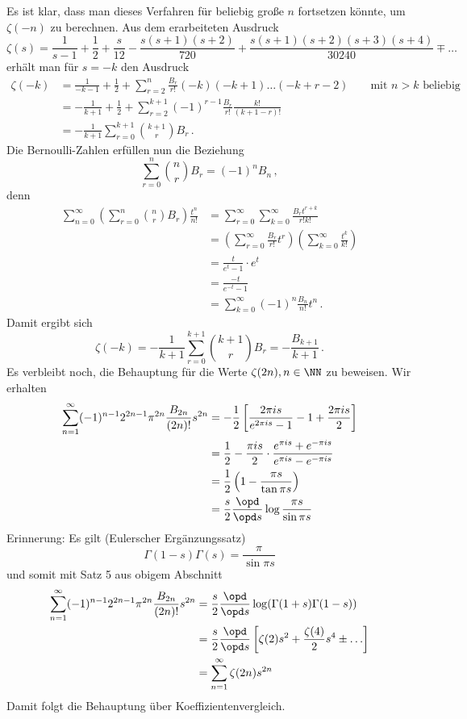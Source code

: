 Es ist klar, dass man dieses Verfahren für beliebig große $n$ fortsetzen könnte, um $\zeta(-n)$ zu berechnen. Aus dem erarbeiteten Ausdruck 
\[
	\zeta(s)
	= \frac 1{s-1} + \frac 12 + \frac s{12} - \frac {s(s+1)(s+2)}{720} + \frac {s(s+1)(s+2)(s+3)(s+4)}{30240} \mp \ldots
\]
erhält man für $s = -k$ den Ausdruck
\begin{align*}
	\zeta(-k)
	&= \frac 1{-k-1} + \frac 12 + \sum_{r=2}^n \frac {B_r}{r!} (-k)(-k+1) \ldots (-k+r-2) && \text{ mit }n > k\text{ beliebig} \\
	&= - \frac 1{k+1} + \frac 12 + \sum_{r=2}^{k+1} (-1)^{r-1} \frac {B_r}{r!} \frac {k!}{(k+1-r)!} \\
	&= - \frac 1{k+1} \sum_{r=0}^{k+1} \binom {k+1}r B_r
	\,.
\end{align*}
Die Bernoulli-Zahlen erfüllen nun die Beziehung
\[
	\sum_{r=0}^n \binom nr B_r = (-1)^n B_n
	\,,
\]
denn
\begin{align*}
	\sum_{n=0}^\infty \left( \sum_{r=0}^n \binom nr B_r \right) \frac {t^n}{n!}
	&= \sum_{r=0}^\infty \sum_{k=0}^\infty \frac {B_r t^{r+k}}{r!k!} \\
	&= \left( \sum_{r=0}^\infty \frac {B_r}{r!} t^r \right) \left( \sum_{k=0}^\infty \frac {t^k}{k!} \right) \\
	&= \frac t{e^t - 1} \cdot e^t \\
	&= \frac {-t}{e^{-t} - 1} \\
	&= \sum_{k=0}^\infty (-1)^n \frac {B_n}{n!} t^n
	\,.
\end{align*}
Damit ergibt sich
\[
	\zeta(-k) = - \frac 1{k+1} \sum_{r=0}^{k+1} \binom {k+1}r B_r = - \frac {B_{k+1}}{k+1}
	\,.
\]
Es verbleibt noch, die Behauptung für die Werte $\zeta(2n), n \in \NN$ zu beweisen. Wir erhalten
\begin{align*}
	\sum_{n=1}^\infty (-1)^{n-1} 2^{2n-1} \pi^{2n} \frac {B_{2n}}{(2n)!} s^{2n}
	&= - \frac 12 \left[ \frac {2\pi is}{e^{2\pi is} - 1} - 1 + \frac {2\pi is}2 \right] \\
	&= \frac 12 - \frac {\pi is}2 \cdot \frac {e^{\pi is} + e^{-\pi is}}{e^{\pi is} - e^{-\pi is}} \\
	&= \frac 12 \left( 1 - \frac {\pi s}{\tan \pi s} \right) \\
	&= \frac s2 \frac {\opd}{\opd s} \log \frac {\pi s}{\sin \pi s}
\end{align*}
Erinnerung: Es gilt (Eulerscher Ergänzungssatz)
\[
	\Gamma(1-s) \Gamma(s) = \frac \pi{\sin \pi s}
\]
und somit mit Satz 5 aus obigem Abschnitt
\begin{align*}
	\sum_{n=1}^\infty (-1)^{n-1} 2^{2n-1} \pi^{2n} \frac {B_{2n}}{(2n)!} s^{2n}
	&= \frac s2 \frac {\opd}{\opd s} \log (\Gamma(1+s) \Gamma(1-s)) \\
	&= \frac s2 \frac {\opd}{\opd s} \left[ \zeta(2)s^2 + \frac {\zeta(4)}2 s^4 \pm \ldots \right] \\
	&= \sum_{n=1}^\infty \zeta(2n) s^{2n}
\end{align*}
Damit folgt die Behauptung über Koeffizientenvergleich.


